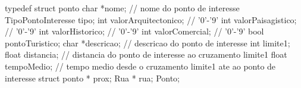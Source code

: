 typedef struct ponto {
	char *nome; // nome do ponto de interesse
	TipoPontoInteresse tipo;
	int valorArquitectonico; // '0'-'9'
	int valorPaisagistico; // '0'-'9'
	int valorHistorico; // '0'-'9'
	int valorComercial; // '0'-'9'
	bool pontoTuristico;
	char *descricao; // descricao do ponto de interesse
	int limite1;
	float distancia; // distancia do ponto de interesse ao cruzamento limite1
	float tempoMedio; // tempo medio desde o cruzamento limite1 ate ao ponto de interesse
	struct ponto * prox;
	Rua * rua;
}Ponto;
